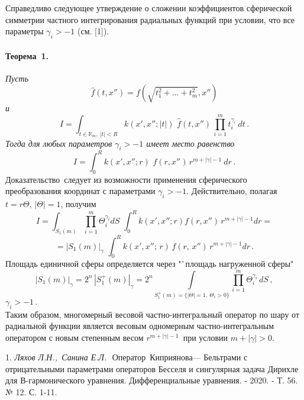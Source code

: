 Справедливо следующее утверждение о сложении коэффициентов сферической симметрии частного интегрирования радиальных функций при условии, что все параметры $\gamma_i>-1$ (см. [1]). 

\paragraph{Теорема~1.} {\it Пусть 
$$
\widehat{f}(t,x'')=f\left(\sqrt{t_{1}^{2}+\ldots+ 
t_{m}^2}, x''\right)
$$
и
$$
I=\int_{t\in\mathbb{R}_m,~|t|<R} k(x',x'';|t|)\,\, \widehat{f}(t,x'')\,
\prod_{i=1}^m t_i^{\gamma_i}~ dt\,.
$$
Тогда для любых параметров $\gamma_i>-1$ имеет место равенство
$$
I=\int_0^R k(x',x'';r)\,\, f(r,x'')\,r^{m+|\gamma|-1}~ dr\,.
$$}
Доказательство\, следует из возможности применения сферического преобразования координат с параметрами
$\gamma_i>-1$. Действительно, полагая
$t=r\Theta,\, |\Theta|=1$, получим 
$$I= \int_{S_1(m)}\prod_{i=1}^m \Theta_i^{\gamma_i}dS\,\,\int_{0}^{R} k\left(x',x''; r\right)
f\left(r, x''\right)\, r^{m+|\gamma|-1} d r=
$$
$$
=|S_1(m)|_\gamma\,\,\int_{0}^{R} k(x',x'';\, r)\, f(r,\, x'')\, r^{m+|\gamma|-1} d r\,.
$$
Площадь единичной сферы определяется через "`площадь нагруженной сферы"
\begin{equation*}
|S_1(m)|_\gamma=2^n\,|S^+_1(m)|_\gamma=2^n
\int\limits_{S_1^+(m)=\{|\Theta|=1,~\Theta_i>0\} } \prod_{i=1}^m\Theta_i^{\gamma_i}\,dS\,,
\end{equation*}
$\gamma_i>-1\,.$\\
Таким образом, многомерный весовой частно-интегральный оператор по шару от радиальной функции является весовым одномерным частно-интегральным оператором с новым степенным весом $r^{m+|\gamma|-1}$\, при условии $m+|\gamma|>0$.


\litlist

1. {\it Ляхов Л.Н.,\, Санина Е.Л.}\,\, 
Оператор\, Киприянова--- Бельтрами с отрицательными параметрами операторов Бесселя и сингулярная задача Дирихле для В-гармонического уравнения. Дифференциальные уравнения. - 2020. - Т. 56. № 12. С. 1-11.
